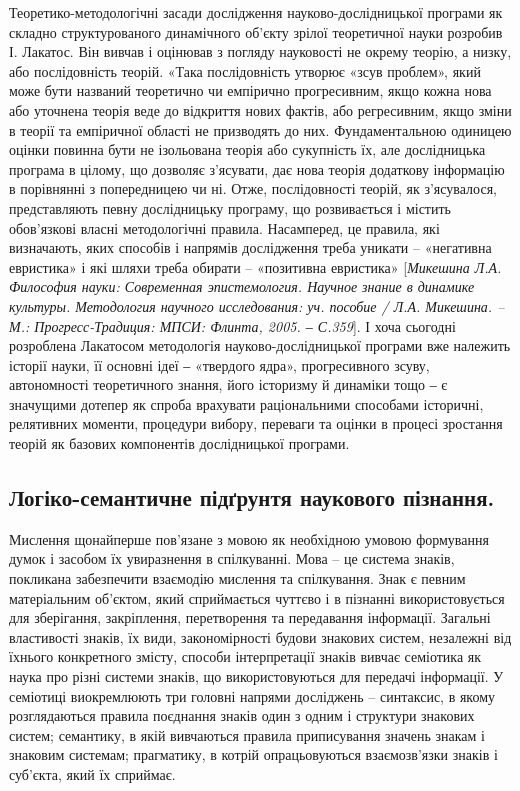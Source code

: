 Теоретико-методологічні засади дослідження науково-дослідницької
програми як складно структурованого динамічного об’єкту зрілої теоретичної
науки розробив І. Лакатос. Він вивчав і оцінював з погляду науковості не
окрему теорію, а низку, або послідовність теорій. «Така послідовність утворює
«зсув проблем», який може бути названий теоретично чи емпірично
прогресивним, якщо кожна нова або уточнена теорія веде до відкриття нових
фактів, або регресивним, якщо зміни в теорії та емпіричної області не
призводять до них. Фундаментальною одиницею оцінки повинна бути не
ізольована теорія або сукупність їх, але дослідницька програма в цілому, що
дозволяє з’ясувати, дає нова теорія додаткову інформацію в порівнянні з
попередницею чи ні. Отже, послідовності теорій, як з’ясувалося, представляють
певну дослідницьку програму, що розвивається і містить обов’язкові власні
методологічні правила. Насамперед, це правила, які визначають, яких способів і
напрямів дослідження треба уникати – «негативна евристика» і які шляхи треба
обирати – «позитивна евристика» [\textit{Микешина Л.А. Философия науки:
Современная эпистемология. Научное знание в динамике культуры.
Методология научного исследования: уч. пособие / Л.А. Микешина. – М.:
Прогресс-Традиция: МПСИ: Флинта, 2005. ‒ С.359}]. І хоча сьогодні розроблена
Лакатосом методологія науково-дослідницької програми вже належить історії
науки, її основні ідеї ‒ «твердого ядра», прогресивного зсуву, автономності
теоретичного знання, його історизму й динаміки тощо ‒ є значущими дотепер
як спроба врахувати раціональними способами історичні, релятивних моменти,
процедури вибору, переваги та оцінки в процесі зростання теорій як базових
компонентів дослідницької програми.

\subsection{Логіко-семантичне підґрунтя наукового пізнання.} Мислення
щонайперше пов’язане з мовою як необхідною умовою формування думок і
засобом їх увиразнення в спілкуванні. Мова – це система знаків, покликана
забезпечити взаємодію мислення та спілкування. Знак є певним матеріальним
об’єктом, який сприймається чуттєво і в пізнанні використовується для
зберігання, закріплення, перетворення та передавання інформації. Загальні
властивості знаків, їх види, закономірності будови знакових систем, незалежні
від їхнього конкретного змісту, способи інтерпретації знаків вивчає семіотика
як наука про різні системи знаків, що використовуються для передачі
інформації. У семіотиці виокремлюють три головні напрями досліджень –
синтаксис, в якому розглядаються правила поєднання знаків один з одним і
структури знакових систем; семантику, в якій вивчаються правила
приписування значень знакам і знаковим системам; прагматику, в котрій
опрацьовуються взаємозв’язки знаків і суб’єкта, який їх сприймає.

